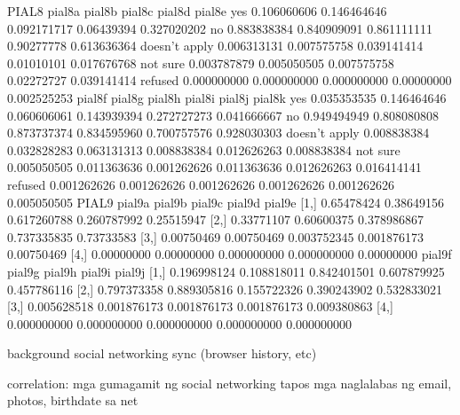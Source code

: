     PIAL8
                            pial8a      pial8b      pial8c     pial8d      pial8e
        yes             0.106060606 0.146464646 0.092171717 0.06439394 0.327020202
        no              0.883838384 0.840909091 0.861111111 0.90277778 0.613636364
        doesn't apply   0.006313131 0.007575758 0.039141414 0.01010101 0.017676768
        not sure        0.003787879 0.005050505 0.007575758 0.02272727 0.039141414
        refused         0.000000000 0.000000000 0.000000000 0.00000000 0.002525253
                            pial8f      pial8g      pial8h      pial8i      pial8j      pial8k
        yes             0.035353535 0.146464646 0.060606061 0.143939394 0.272727273 0.041666667
        no              0.949494949 0.808080808 0.873737374 0.834595960 0.700757576 0.928030303
        doesn't apply   0.008838384 0.032828283 0.063131313 0.008838384 0.012626263 0.008838384
        not sure        0.005050505 0.011363636 0.001262626 0.011363636 0.012626263 0.016414141
        refused         0.001262626 0.001262626 0.001262626 0.001262626 0.001262626 0.005050505
    PIAL9
                    pial9a     pial9b      pial9c      pial9d     pial9e
                    [1,] 0.65478424 0.38649156 0.617260788 0.260787992 0.25515947
                    [2,] 0.33771107 0.60600375 0.378986867 0.737335835 0.73733583
                    [3,] 0.00750469 0.00750469 0.003752345 0.001876173 0.00750469
                    [4,] 0.00000000 0.00000000 0.000000000 0.000000000 0.00000000
                    pial9f      pial9g      pial9h      pial9i      pial9j
                    [1,] 0.196998124 0.108818011 0.842401501 0.607879925 0.457786116
                    [2,] 0.797373358 0.889305816 0.155722326 0.390243902 0.532833021
                    [3,] 0.005628518 0.001876173 0.001876173 0.001876173 0.009380863
                    [4,] 0.000000000 0.000000000 0.000000000 0.000000000 0.000000000



background
    social networking
    sync (browser history, etc)

correlation:
    mga gumagamit ng social networking tapos mga naglalabas ng email, photos, birthdate sa net

